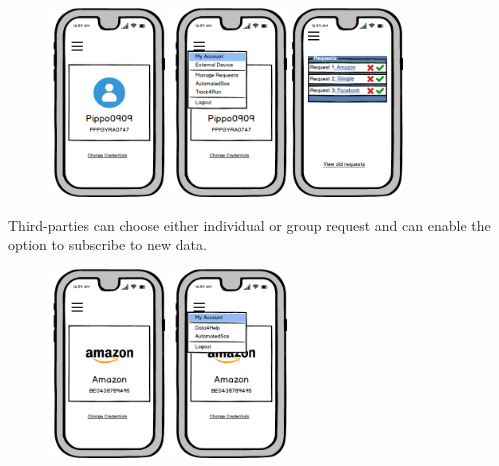 \documentclass[a4paper]{article}
\begin{document}
\begin{figure}[!htpb]
    	\centering
    	\includegraphics[height=50mm]{images/mockups/IndividualProfile.png}
    	\includegraphics[height=50mm]{images/mockups/IndividualProfileOpen.png}
    	\includegraphics[height=50mm]{images/mockups/ManageRequests.png}
\end{figure}

Third-parties can choose either individual or group request and can enable the option to subscribe to new data.

\begin{figure}[!htpb]
    \centering
    \includegraphics[height=50mm]{images/mockups/ThirdPartyProfile.png}
    \includegraphics[height=50mm]{images/mockups/ThirdPartyProfileOpen.png}
\end{figure}
\end{document}
